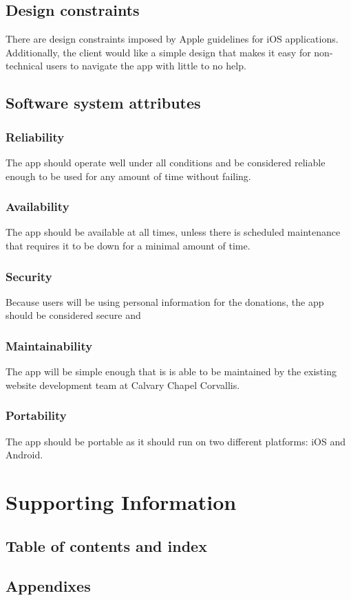 \documentclass[letterpaper,10pt,draftclsnofoot,onecolumn,compsoc,titlepage]{IEEEtran}
\begin{document}
	\subsection{Design constraints}
	There are design constraints imposed by Apple guidelines for iOS applications.
	Additionally, the client would like a simple design that makes it easy for non-technical users to navigate the app with little to no help.

	\subsection{Software system attributes}
	\subsubsection{Reliability} The app should operate well under all conditions and be considered reliable enough to be used for any amount of time without failing.
	\subsubsection{Availability} The app should be available at all times, unless there is scheduled maintenance that requires it to be down for a minimal amount of time.
	\subsubsection{Security} Because users will be using personal information for the donations, the app should be considered secure and
	\subsubsection{Maintainability} The app will be simple enough that is is able to be maintained by the existing website development team at Calvary Chapel Corvallis.
	\subsubsection{Portability} The app should be portable as it should run on two different platforms: iOS and Android.


	\section{Supporting Information}
	\subsection{Table of contents and index}
	\subsection{Appendixes}
\end{document}
